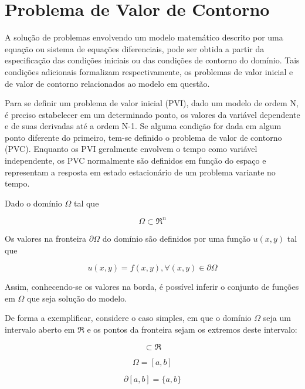 \section{Problema de Valor de Contorno}

A solução de problemas envolvendo um modelo matemático descrito por uma equação ou sistema de equações diferenciais, pode ser obtida  a partir da especificação das condições iniciais ou das condições de contorno do domínio. Tais condições adicionais formalizam respectivamente, os problemas de valor inicial e de valor de contorno relacionados ao modelo em questão.

Para se definir um problema de valor inicial (PVI), dado um modelo de ordem N, é preciso estabelecer em um determinado ponto, os valores da variável dependente e de suas derivadas até a ordem N-1. Se alguma condição for dada em algum ponto diferente do primeiro, tem-se definido o problema de valor de contorno (PVC). Enquanto os PVI geralmente envolvem o tempo como variável independente, os PVC normalmente são definidos em função do espaço e representam a resposta em estado estacionário de um problema variante no tempo.
\citep[p. 447]{boyce_diprima}

Dado o domínio $ \Omega $ tal que

\begin{equation}
  \Omega \subset \Re^{n}
\end{equation}

Os valores na fronteira $ \partial \Omega $ do domínio são definidos por uma função $ u(x, y) $ tal que

\begin{equation}
  u(x, y) = f(x, y),  \forall (x, y) \in \partial \Omega
\end{equation}

Assim, conhecendo-se os valores na borda, é possível inferir o conjunto de funções em $ \Omega $ que seja solução do modelo. 

De forma a exemplificar, considere o caso simples, em que o domínio $ \Omega $ seja um intervalo aberto em $ \Re $ e os pontos da fronteira sejam os extremos deste intervalo: 

\begin{equation}
  [a, b] \subset \Re
\end{equation}

\begin{equation}
  \Omega = [a, b]
\end{equation}

\begin{equation}
  \partial [a, b] = \{ a, b \}
\end{equation}

